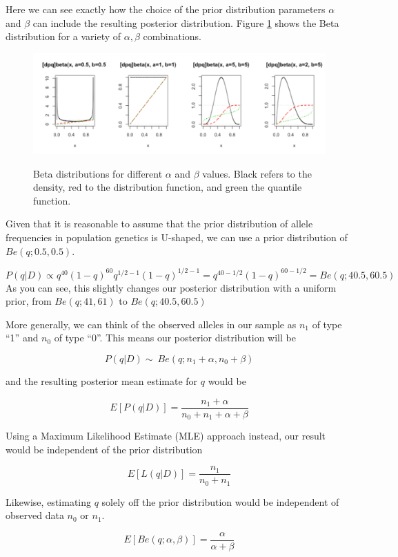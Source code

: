 \documentclass[12pt]{article}
\begin{document}
Here we can see exactly how the choice of the prior distribution parameters $\alpha$ and $\beta$ can include the resulting posterior distribution. Figure \ref{fig:2015-01-19_beta} shows the Beta distribution for a variety of $\alpha,\beta$ combinations.

\begin{figure}
\includegraphics[width=\textwidth]{figures/Betas.pdf}
\label{fig:2015-01-19_beta}
\caption{Beta distributions for different $\alpha$ and $\beta$ values. Black refers to the density, red to the distribution function, and green the quantile function.}
\end{figure}

 Given that it is reasonable to assume that the prior distribution of allele frequencies in population genetics is U-shaped, we can use a prior distribution of $Be(q;0.5,0.5)$.

 \[
P(q|D) \propto  q^{40} (1-q)^{60} q^{1/2-1} (1-q)^{1/2-1} = q^{40-1/2} (1-q)^{60-1/2} = Be(q;40.5,60.5)
\]
As you can see, this slightly changes our posterior distribution with a uniform prior, from $Be(q;41,61)$ to $Be(q;40.5,60.5)$


More generally, we can think of the observed alleles in our sample as $n_1$ of type ``1'' and $n_0$ of type ``0''. This means our posterior distribution will be

\[
P(q|D) \sim\  Be(q;n_1+\alpha,n_0+\beta)
\]

and the resulting posterior mean estimate for $q$ would be

\[
E[P(q|D)] = \frac{n_1+\alpha}{n_0+n_1+\alpha+\beta}
\]

Using a Maximum Likelihood Estimate (MLE) approach instead, our result would be independent of the prior distribution

\[
E[L(q|D)] = \frac{n_1}{n_0+n_1}
\]

Likewise, estimating $q$ solely off the prior distribution would be independent of observed data $n_0$ or $n_1$.

\[
E[Be(q;\alpha,\beta)] = \frac{\alpha}{\alpha+\beta}
\]
\end{document}
